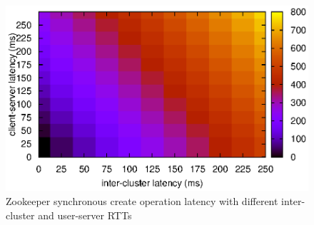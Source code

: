 \begin{figure}[h]
\centering
\includegraphics[scale=0.75]{img/sync_ops_latencies_heatmap.eps}
\caption{Zookeeper synchronous create operation latency with different inter-cluster and user-server RTTs}
\label{fig:sync_heatmap}
\end{figure}

